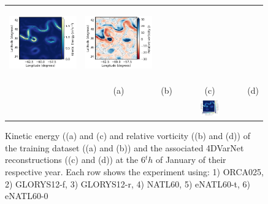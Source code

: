 \begin{bibunit}
\begin{figure}[H]
\begin{center}
\begin{tabular}{ccccc}
 \includegraphics[trim={18mm 0 26mm 5mm},clip, width=2.9cm,height=3.1cm]{00_Simulearning/figures/plots2/enatl60-0_rec_ke.png} &
 \includegraphics[trim={18mm 0 26mm 5mm},clip,width=2.9cm,height=3.1cm]{00_Simulearning/figures/plots2/enatl60-0_rec_vort_r.png} \\
 \hspace{-15mm} &(a) & (b) & (c) & (d) \\
 &&
&\hspace{-30mm} \includegraphics[trim={8mm 0 22mm 7cm},clip,width=2.5cm,height=0.7cm]{00_Simulearning/figures/plots/horizontal_cbar_ke_bottom.png} &\\

\end{tabular}
\vspace{-3mm}
\caption{
Kinetic energy ((a) and (c) and relative vorticity ((b) and (d)) of the training dataset ((a) and (b)) and the associated 4DVarNet reconstructions ((c) and (d)) at the 6$^th$ of January of their respective year.
Each row shows the experiment using: 1) ORCA025, 2) GLORYS12-f, 3) GLORYS12-r, 4) NATL60, 5) eNATL60-t, 6) eNATL60-0}
\vspace{-5mm}
\label{fig:maps}
\end{center}
\end{figure}




\end{bibunit}
